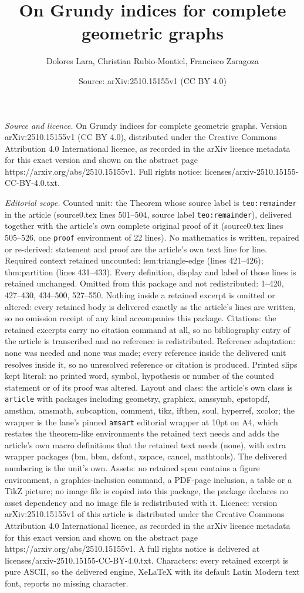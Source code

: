 \documentclass[10pt,a4paper]{amsart}
\title[On Grundy indices for complete geometric graphs]{On Grundy indices for complete geometric graphs}
\author{Dolores Lara, Christian Rubio-Montiel, Francisco Zaragoza}
\date{Source: arXiv:2510.15155v1 (CC BY 4.0)}
\begin{document}
\maketitle

\noindent\emph{Source and licence.} On Grundy indices for complete geometric graphs. Version arXiv:2510.15155v1 (CC BY 4.0), distributed under the Creative Commons Attribution 4.0 International licence, as recorded in the arXiv licence metadata for this exact version and shown on the abstract page https://arxiv.org/abs/2510.15155v1. Full rights notice: licenses/arxiv-2510.15155-CC-BY-4.0.txt.\par\smallskip

\noindent\textit{Editorial scope.} Counted unit: the Theorem whose source label is \texttt{teo:remainder} in the article (source0.tex lines 501--504, source label \texttt{teo:remainder}), delivered together with the article's own complete original proof of it (source0.tex lines 505--526, one \texttt{proof} environment of 22 lines). No mathematics is written, repaired or re-derived: statement and proof are the article's own text line for line. Required context retained uncounted: lem:triangle-edge (lines 421--426); thm:partition (lines 431--433). Every definition, display and label of those lines is retained unchanged. Omitted from this package and not redistributed: 1--420, 427--430, 434--500, 527--550. Nothing inside a retained excerpt is omitted or altered: every retained body is delivered exactly as the article's lines are written, so no omission receipt of any kind accompanies this package. Citations: the retained excerpts carry no citation command at all, so no bibliography entry of the article is transcribed and no reference is redistributed. Reference adaptation: none was needed and none was made; every reference inside the delivered unit resolves inside it, so no unresolved reference or citation is produced. Printed slips kept literal: no printed word, symbol, hypothesis or number of the counted statement or of its proof was altered. Layout and class: the article's own class is \texttt{article} with packages including geometry, graphicx, amssymb, epstopdf, amsthm, amsmath, subcaption, comment, tikz, ifthen, soul, hyperref, xcolor; the wrapper is the lane's pinned \texttt{amsart} editorial wrapper at 10pt on A4, which restates the theorem-like environments the retained text needs and adds the article's own macro definitions that the retained text needs (none), with extra wrapper packages (bm, bbm, dsfont, xspace, cancel, mathtools). The delivered numbering is the unit's own. Assets: no retained span contains a figure environment, a graphics-inclusion command, a PDF-page inclusion, a table or a TikZ picture; no image file is copied into this package, the package declares no asset dependency and no image file is redistributed with it. Licence: version arXiv:2510.15155v1 of this article is distributed under the Creative Commons Attribution 4.0 International licence, as recorded in the arXiv licence metadata for this exact version and shown on the abstract page https://arxiv.org/abs/2510.15155v1. A full rights notice is delivered at licenses/arxiv-2510.15155-CC-BY-4.0.txt. Characters: every retained excerpt is pure ASCII, so the delivered engine, XeLaTeX with its default Latin Modern text font, reports no missing character.
\end{document}
